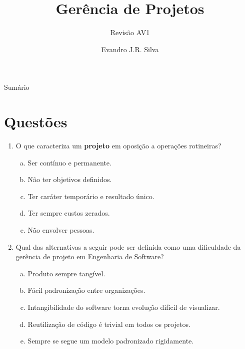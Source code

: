 \documentclass{beamer}
\title[GP Revisão]{Gerência de Projetos}
\subtitle{Revisão AV1}
\author[E.J.R. Silva]{Evandro J.R. Silva}
\date{}
\begin{document}
    
\begin{frame}
    \titlepage
\end{frame}

\begin{frame}{Sumário}
    \tableofcontents
\end{frame}

\section{Questões}

\begin{frame}
    \begin{enumerate}
        \justifying
        \item<1-2> O que caracteriza um \textbf{projeto} em oposição a operações rotineiras?
            \begin{enumerate}[a)]
                \justifying
                \item<1-2> Ser contínuo e permanente.
                \item<1-2> Não ter objetivos definidos.
                \item<1-2> \alert<2>{Ter caráter temporário e resultado único}.
                \item<1-2> Ter sempre custos zerados.
                \item<1-2> Não envolver pessoas.
            \end{enumerate}
        \item<3-4> Qual das alternativas a seguir pode ser definida como uma dificuldade da gerência de projeto em Engenharia de Software?
            \begin{enumerate}[a)]
                \justifying
                \item<3-4> Produto sempre tangível.
                \item<3-4> Fácil padronização entre organizações.
                \item<3-4> \alert<4>{Intangibilidade do software torna evolução difícil de visualizar}.
                \item<3-4> Reutilização de código é trivial em todos os projetos.
                \item<3-4> Sempre se segue um modelo padronizado rigidamente.
            \end{enumerate}
    \end{enumerate}
\end{frame}
\end{document}
